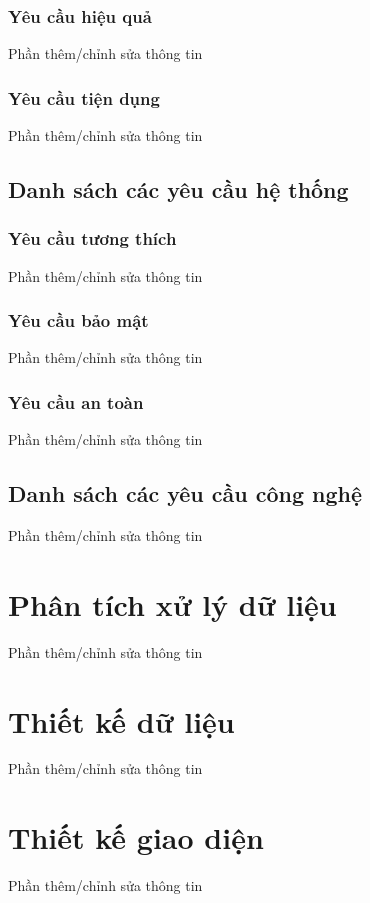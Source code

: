 \documentclass[12pt]{report}
\begin{document}
        \subsection{Yêu cầu hiệu quả}
            Phần thêm/chỉnh sửa thông tin
        \subsection{Yêu cầu tiện dụng}
            Phần thêm/chỉnh sửa thông tin
    \section{Danh sách các yêu cầu hệ thống}
        \subsection{Yêu cầu tương thích}
            Phần thêm/chỉnh sửa thông tin
        \subsection{Yêu cầu bảo mật}
            Phần thêm/chỉnh sửa thông tin
        \subsection{Yêu cầu an toàn}
            Phần thêm/chỉnh sửa thông tin
    \section{Danh sách các yêu cầu công nghệ}
        Phần thêm/chỉnh sửa thông tin
\chapter{Phân tích xử lý dữ liệu}
    Phần thêm/chỉnh sửa thông tin
\chapter{Thiết kế dữ liệu}
    Phần thêm/chỉnh sửa thông tin
\chapter{Thiết kế giao diện}
    Phần thêm/chỉnh sửa thông tin
\end{document}
